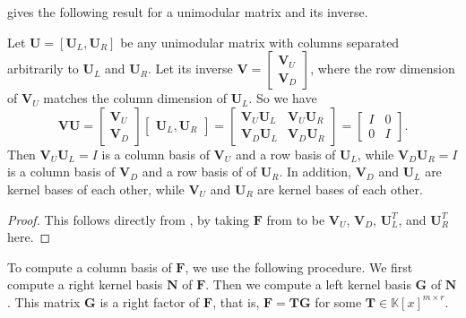  gives the following
result for a unimodular matrix and its inverse.
\begin{cor}
\label{cor:unimodular_kernel_columnBasis2}Let $\mathbf{U}=\left[\mathbf{U}_{L},\mathbf{U}_{R}\right]$
be any unimodular matrix with columns separated arbitrarily to $\mathbf{U}_{L}$
and $\mathbf{U}_{R}$. Let its inverse $\mathbf{V}=\begin{bmatrix}\mathbf{V}_{U}\\
\mathbf{V}_{D}
\end{bmatrix}$, where the row dimension of $\mathbf{V}_{U}$ matches the column
dimension of $\mathbf{U}_{L}$. So we have 
\[
\mathbf{V}\mathbf{U}=\begin{bmatrix}\mathbf{V}_{U}\\
\mathbf{V}_{D}
\end{bmatrix}\begin{bmatrix}\mathbf{U}_{L},\mathbf{U}_{R}\end{bmatrix}=\begin{bmatrix}\mathbf{V}_{U}\mathbf{U}_{L} & \mathbf{V}_{U}\mathbf{U}_{R}\\
\mathbf{V}_{D}\mathbf{U}_{L} & \mathbf{V}_{D}\mathbf{U}_{R}
\end{bmatrix}=\begin{bmatrix}I & 0\\
0 & I
\end{bmatrix}.
\]
Then $\mathbf{V}_{U}\mathbf{U}_{L}=I$ is a column basis of $\mathbf{V}_{U}$
and a row basis of $\mathbf{U}_{L}$, while $\mathbf{V}_{D}\mathbf{U}_{R}=I$
is a column basis of $\mathbf{V}_{D}$ and a row basis of of $\mathbf{U}_{R}$.
In addition, \textup{$\mathbf{V}_{D}$ and $\mathbf{U}_{L}$ are kernel
bases of each other, while $\mathbf{V}_{U}$ and $\mathbf{U}_{R}$
are kernel bases of each other.}\end{cor}
\begin{proof}
This follows directly from ,
by taking $\mathbf{F}$ from 
to be $\mathbf{V}_{U}$, $\mathbf{V}_{D}$, $\mathbf{U}_{L}^{T}$,
and $\mathbf{U}_{R}^{T}$ here.
\end{proof}
To compute a column basis of $\mathbf{F}$, we use the following procedure.
We first compute a right  kernel basis $\mathbf{N}$ of $\mathbf{F}$.
Then we compute a left  kernel basis $\mathbf{G}$ of $\mathbf{N}$.
This matrix $\mathbf{G}$ is a right factor of $\mathbf{F}$, that
is, $\mathbf{F}=\mathbf{T}\mathbf{G}$ for some $\mathbf{T}\in\mathbb{K}\left[x\right]^{m\times r}$.
